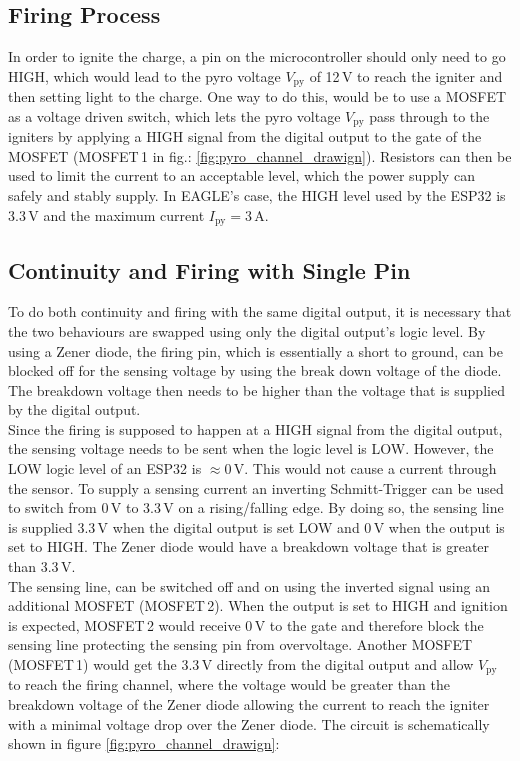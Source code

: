 \documentclass[fontsize=11pt,%
twoside,%
BCOR          = 8mm, %
DIV           = 11,  %
titlepage     = off,%
index=totoc,%
xcolor        = pdftex,%
dvipsnames,%
bibliography  = totoc,%
bibliography = numbered, %
listof        = notnumbered]{scrreprt}
\begin{document}
\subsection{Firing Process}
In order to ignite the charge, a pin on the microcontroller should only need to go HIGH, which would lead to the pyro voltage $V_\text{py}$ of 12\,V to reach the igniter and then setting light to the charge. One way to do this, would be to use a MOSFET as a voltage driven switch, which lets the pyro voltage $V_\text{py}$ pass through to the igniters by applying a HIGH signal from the digital output to the gate of the MOSFET (MOSFET\,1 in fig.: \ref{fig:pyro_channel_drawign}). Resistors can then be used to limit the current to an acceptable level, which the power supply can safely and stably supply. In EAGLE's case, the HIGH level used by the ESP32 is 3.3\,V and the maximum current $I_\text{py} = 3\,$A.

\subsection{Continuity and Firing with Single Pin}
To do both continuity and firing with the same digital output, it is necessary that the two behaviours are swapped using only the digital output's logic level. By using a Zener diode, the firing pin, which is essentially a short to ground, can be blocked off for the sensing voltage by using the break down voltage of the diode. The breakdown voltage then needs to be higher than the voltage that is supplied by the digital output.\\
Since the firing is supposed to happen at a HIGH signal from the digital output, the sensing voltage needs to be sent when the logic level is LOW. However, the LOW logic level of an ESP32 is $\approx0$\,V. This would not cause a current through the sensor. To supply a sensing current an inverting Schmitt-Trigger can be used to switch from 0\,V to 3.3\,V on a rising/falling edge. By doing so, the sensing line is supplied 3.3\,V when the digital output is set LOW and 0\,V when the output is set to HIGH. The Zener diode would have a breakdown voltage that is greater than 3.3\,V.\\
The sensing line, can be switched off and on using the inverted signal using an additional MOSFET (MOSFET\,2). When the output is set to HIGH and ignition is expected, MOSFET\,2 would receive 0\,V to the gate and therefore block the sensing line protecting the sensing pin from overvoltage. Another MOSFET (MOSFET\,1) would get the 3.3\,V directly from the digital output and allow $V_\text{py}$ to reach the firing channel, where the voltage would be greater than the breakdown voltage of the Zener diode allowing the current to reach the igniter with a minimal voltage drop over the Zener diode. The circuit is schematically shown in figure \ref{fig:pyro_channel_drawign}:
\end{document}
